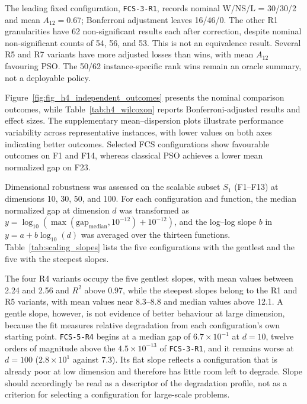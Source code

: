 

The leading fixed configuration, \texttt{FCS-3-R1}, records nominal W/NS/L = 30/30/2 and mean $A_{12}=0.67$; Bonferroni adjustment leaves 16/46/0. The other R1 granularities have 62 non-significant results each after correction, despite nominal non-significant counts of 54, 56, and 53. This is not an equivalence result. Several R5 and R7 variants have more adjusted losses than wins, with mean $A_{12}$ favouring PSO. The 50/62 instance-specific rank wins remain an oracle summary, not a deployable policy.

Figure~\ref{fig:fig_h4_independent_outcomes} presents the nominal comparison outcomes, while Table~\ref{tab:h4_wilcoxon} reports Bonferroni-adjusted results and effect sizes. The supplementary mean--dispersion plots illustrate performance variability across representative instances, with lower values on both axes indicating better outcomes. Selected FCS configurations show favourable outcomes on F1 and F14, whereas classical PSO achieves a lower mean normalized gap on F23.


Dimensional robustness was assessed on the scalable subset $S_1$ (F1--F13) at dimensions 10, 30, 50, and 100. For each configuration and function, the median normalized gap at dimension $d$ was transformed as $y=\log_{10}(\max(\text{gap}_{\mathrm{median}},10^{-12})+10^{-12})$, and the log--log slope $b$ in $y=a+b\log_{10}(d)$ was averaged over the thirteen functions. Table~\ref{tab:scaling_slopes} lists the five configurations with the gentlest and the five with the steepest slopes.



The four R4 variants occupy the five gentlest slopes, with mean values between 2.24 and 2.56 and $R^2$ above 0.97, while the steepest slopes belong to the R1 and R5 variants, with mean values near 8.3--8.8 and median values above 12.1. A gentle slope, however, is not evidence of better behaviour at large dimension, because the fit measures relative degradation from each configuration's own starting point. \texttt{FCS-5-R4} begins at a median gap of $6.7 \times 10^{-1}$ at $d=10$, twelve orders of magnitude above the $4.5 \times 10^{-13}$ of \texttt{FCS-3-R1}, and it remains worse at $d=100$ ($2.8 \times 10^{1}$ against $7.3$). Its flat slope reflects a configuration that is already poor at low dimension and therefore has little room left to degrade. Slope should accordingly be read as a descriptor of the degradation profile, not as a criterion for selecting a configuration for large-scale problems.


